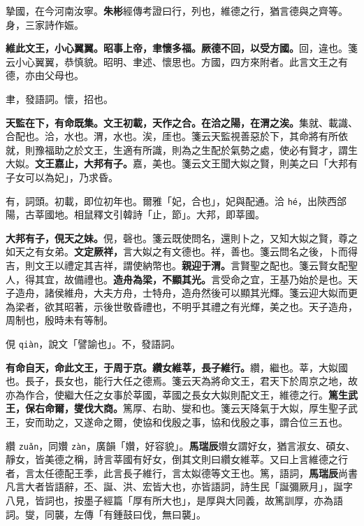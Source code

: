 \begin{quoting}摯國，在今河南汝寧。\textbf{朱彬}經傳考證曰行，列也，維德之行，猶言德與之齊等。身，三家詩作娠。\end{quoting}

\textbf{維此文王，小心翼翼。昭事上帝，聿懷多福。厥德不回，以受方國。}{\footnotesize 回，違也。箋云小心翼翼，恭慎貌。昭明、聿述、懷思也。方國，四方來附者。此言文王之有德，亦由父母也。}

\begin{quoting}聿，發語詞。懷，招也。\end{quoting}

\textbf{天監在下，有命既集。文王初載，天作之合。在洽之陽，在渭之涘。}{\footnotesize 集就、載識、合配也。洽，水也。渭，水也。涘，厓也。箋云天監視善惡於下，其命將有所依就，則豫福助之於文王，生適有所識，則為之生配於氣勢之處，使必有賢才，謂生大姒。}\textbf{文王嘉止，大邦有子。}{\footnotesize 嘉，美也。箋云文王聞大姒之賢，則美之曰「大邦有子女可以為妃」，乃求昏。}

\begin{quoting}有，詞頭。初載，即位初年也。爾雅「妃，合也」，妃與配通。洽 \texttt{hé}，出陝西郃陽，古莘國地。相鼠釋文引韓詩「止，節」。大邦，即莘國。\end{quoting}

\textbf{大邦有子，俔天之妹。}{\footnotesize 俔，磬也。箋云既使問名，還則卜之，又知大姒之賢，尊之如天之有女弟。}\textbf{文定厥祥，}{\footnotesize 言大姒之有文德也。祥，善也。箋云問名之後，卜而得吉，則文王以禮定其吉祥，謂使納幣也。}\textbf{親迎于渭。}{\footnotesize 言賢聖之配也。箋云賢女配聖人，得其宜，故備禮也。}\textbf{造舟為梁，不顯其光。}{\footnotesize 言受命之宜，王基乃始於是也。天子造舟，諸侯維舟，大夫方舟，士特舟，造舟然後可以顯其光輝。箋云迎大姒而更為梁者，欲其昭著，示後世敬昏禮也，不明乎其禮之有光輝，美之也。天子造舟，周制也，殷時未有等制。}

\begin{quoting}俔 \texttt{qiàn}，說文「譬諭也」。不，發語詞。\end{quoting}

\textbf{有命自天，命此文王，于周于京。纘女維莘，長子維行。}{\footnotesize 纘，繼也。莘，大姒國也。長子，長女也，能行大任之德焉。箋云天為將命文王，君天下於周京之地，故亦為作合，使繼大任之女事於莘國，莘國之長女大姒則配文王，維德之行。}\textbf{篤生武王，保右命爾，燮伐大商。}{\footnotesize 篤厚、右助、燮和也。箋云天降氣于大姒，厚生聖子武王，安而助之，又遂命之爾，使協和伐殷之事，協和伐殷之事，謂合位三五也。}

\begin{quoting}纘 \texttt{zuǎn}，同㜺 \texttt{zàn}，廣韻「㜺，好容貌」。\textbf{馬瑞辰}㜺女謂好女，猶言淑女、碩女、靜女，皆美德之稱，詩言莘國有好女，倒其文則曰纘女維莘。又曰上言維德之行者，言太任德配王季，此言長子維行，言太姒德等文王也。篤，語詞，\textbf{馬瑞辰}尚書凡言大者皆語辭，丕、誕、洪、宏皆大也，亦皆語詞，詩生民「誕彌厥月」，誕字八見，皆詞也，按墨子經篇「厚有所大也」，是厚與大同義，故篤訓厚，亦為語詞。燮，同襲，左傳「有鍾鼓曰伐，無曰襲」。\end{quoting}

